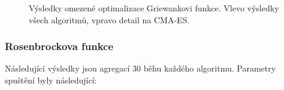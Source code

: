 \begin{figure}[H]
    \caption{Výsledky omezené optimalizace Griewankovi funkce. Vlevo výsledky všech algoritmů, vpravo detail na CMA-ES.}
    \label{fg:bench:griewank:joined}
\end{figure}
\subsubsection*{Rosenbrockova funkce}
\label{subsub:rosenbrock:res}
Následující výsledky jsou agregací 30 běhu každého algoritmu. Parametry spuštění byly následující:

